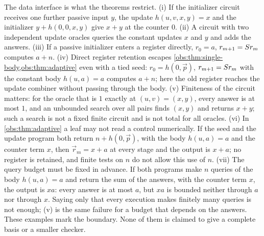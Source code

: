 \begin{remark}
\label{obs:rem:boundary}
The data interface is what the theorems restrict. (i) If the initializer
circuit receives one further passive input $y$, the update $h(u,v,x,y)=x$ and
the initializer $y+h(0,0,x,y)$ give $x+y$ at the counter $0$. (ii) A circuit
with two independent update oracles queries the constant updates $x$ and $y$
and adds the answers. (iii) If a passive initializer enters a register
directly, $r_0=a$, $r_{m+1}=S r_m$ computes $a+n$. (iv) Direct register
retention escapes \cref{obs:thm:single-body,obs:thm:adaptive} even with a tied
seed:
$r_0=h(0,\vec p)$, $r_{m+1}=S r_m$ with the constant body $h(u,a)=a$
computes $a+n$; here the old register reaches the update combiner without
passing through the body. (v) Finiteness of the circuit matters: for the oracle
that is $1$ exactly at $(u,v)=(x,y)$, every answer is at most $1$, and an
unbounded search over all pairs finds $(x,y)$ and returns $x+y$; such a search
is not a fixed finite circuit and is not total for all oracles. (vi) In
\cref{obs:thm:adaptive} a leaf may not read a control numerically. If the seed
and the update program both return $n+h(0,\vec p)$, with the body $h(u,a)=a$ and
the counter term $x$, then $\vec r_m=x+a$ at every stage and the output is
$x+a$; no register is retained, and finite tests on $n$ do not allow this use of
$n$. (vii) The query budget must be fixed in advance. If both programs make $n$
queries of the body $h(u,a)=a$ and return the sum of the answers, with the
counter term $x$, the output is $xa$: every answer is at most $a$, but $xa$ is
bounded neither through $a$ nor through $x$. Saying only that every execution
makes finitely many queries is not enough; (v) is the same failure for a budget
that depends on the answers. These examples mark the boundary. None of them is claimed to give a complete basis or a
smaller checker.
\end{remark}

